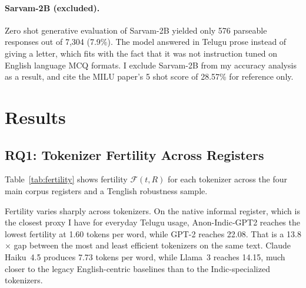 ﻿\documentclass[11pt]{article}
\begin{document}
\paragraph{Sarvam-2B (excluded).}
Zero shot generative evaluation of Sarvam-2B yielded only 576
parseable responses out of 7,304 (7.9\%). The model answered in
Telugu prose instead of giving a letter, which fits with the fact
that it was not instruction tuned on English language MCQ formats.
I exclude Sarvam-2B from my accuracy analysis as a result, and
cite the MILU paper's 5 shot score of 28.57\% for reference only.


\section{Results}
\label{sec:results}

\subsection{RQ1: Tokenizer Fertility Across Registers}
\label{sec:results-fertility}

Table~\ref{tab:fertility} shows fertility $\mathcal{F}(t, R)$ for
each tokenizer across the four main corpus registers and a Tenglish robustness sample.
\begin{table}[H]
\centering
{}
\caption{Fertility (tokens/word) by tokenizer and register. Bold = best on the Telugu registers.}
\label{tab:fertility}
\end{table}
Fertility varies sharply across tokenizers. On the native informal
register, which is the closest proxy I have for everyday Telugu
usage, Anon-Indic-GPT2 reaches the lowest fertility at 1.60
tokens per word, while GPT-2 reaches 22.08. That is a 13.8$\times$
gap between the most and least efficient tokenizers on the same
text. Claude Haiku~4.5 produces 7.73 tokens per word, while Llama~3
reaches 14.15, much closer to the legacy English-centric baselines
than to the Indic-specialized tokenizers.
\end{document}
